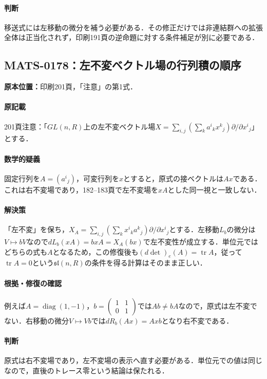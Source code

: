 \documentclass[a4paper,10pt]{ltjsarticle}
\begin{document}
\paragraph{判断}移送式には左移動の微分を補う必要がある．その修正だけでは非連結群への拡張全体は正当化されず，印刷191頁の逆命題に対する条件補足が別に必要である．


\subsection*{MATS-0178：左不変ベクトル場の行列積の順序}\label{math:MATS-0178}
\noindent\textbf{原本位置：}印刷201頁，「注意」の第1式．

\paragraph{原記載}201頁注意：「$GL(n,R)$上の左不変ベクトル場$X=\sum_{i,j}(\sum_k a^i{}_k x^k{}_j)\partial/\partial x^i{}_j$」とする．

\paragraph{数学的疑義}固定行列を$A=(a^i{}_j)$，可変行列を$x$とすると，原式の接ベクトルは$Ax$である．これは右不変場であり，182--183頁で左不変場を$xA$とした同一視と一致しない．

\paragraph{解決策}「左不変」を保ち，$X_A=\sum_{i,j}(\sum_k x^i{}_k a^k{}_j)\partial/\partial x^i{}_j$とする．左移動$L_b$の微分は$V\mapsto bV$なので$dL_b(xA)=bxA=X_A(bx)$で左不変性が成立する．単位元ではどちらの式も$A$となるため，この修復後も$(d\det)_e(A)=\operatorname{tr}A$，従って$\operatorname{tr}A=0$という$\mathfrak{sl}(n,R)$の条件を得る計算はそのまま正しい．

\paragraph{根拠・修復の確認}例えば$A=\operatorname{diag}(1,-1)$，$b=\begin{pmatrix}1&1\\0&1\end{pmatrix}$では$Ab\ne bA$なので，原式は左不変でない．右移動の微分$V\mapsto Vb$では$dR_b(Ax)=Axb$となり右不変である．

\paragraph{判断}原式は右不変場であり，左不変場の表示へ直す必要がある．単位元での値は同じなので，直後のトレース零という結論は保たれる．
\end{document}
